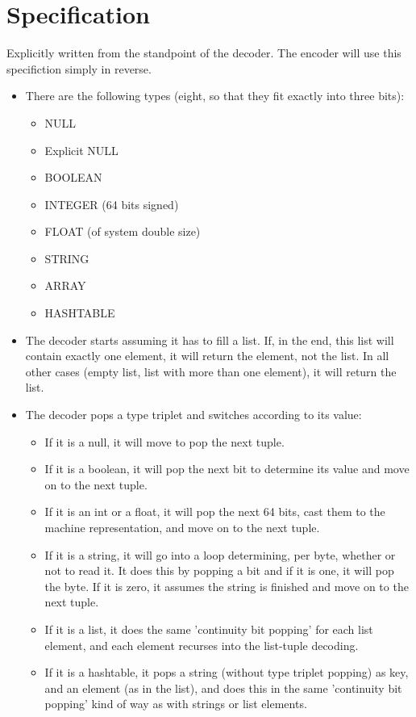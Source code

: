 \section{Specification}

Explicitly written from the standpoint of the decoder.
The encoder will use this specifiction simply in reverse.

\begin{itemize}
\item There are the following types (eight, so that they fit exactly
      into three bits):
  \begin{itemize}
  \item NULL
  \item Explicit NULL
  \item BOOLEAN
  \item INTEGER (64 bits signed)
  \item FLOAT (of system double size)
  \item STRING
  \item ARRAY
  \item HASHTABLE
  \end{itemize}

\item The decoder starts assuming it has to fill a list.
  If, in the end, this list will contain exactly one element, it will
  return the element, not the list. In all other cases (empty list,
  list with more than one element), it will return the list.

\item The decoder pops a type triplet and switches according to its value:
  \begin{itemize}
  \item If it is a null, it will move to pop the next tuple.
  \item If it is a boolean, it will pop the next bit to determine its value
        and move on to the next tuple.
  \item If it is an int or a float, it will pop the next 64 bits,
        cast them to the machine representation, and move on to the next tuple.
  \item If it is a string, it will go into a loop determining, per byte,
        whether or not to read it. It does this by popping a bit and if
        it is one, it will pop the byte. If it is zero, it assumes the
        string is finished and move on to the next tuple.
  \item If it is a list, it does the same 'continuity bit popping' for
        each list element, and each element recurses into the list-tuple
        decoding.
  \item If it is a hashtable, it pops a string (without type triplet popping)
        as key, and an element (as in the list), and does this in the same
        'continuity bit popping' kind of way as with strings or list elements.
  \end{itemize}


\end{itemize}
